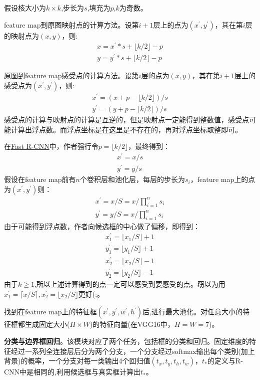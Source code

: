 \documentclass[]{article}
\begin{document}
假设核大小为$k \times k$,步长为$s$,填充为$p$,$k$为奇数。

feature map到原图映射点的计算方法。设第$i+1$层上的点为$(x^{'} ,y^{'})$，其在第$i$层的映射点为$(x,y)$，则:
\begin{align}
x=x^{'}*s+\lfloor k/2 \rfloor - p \\
y=y^{'}*s+\lfloor k/2 \rfloor - p 
\end{align}

原图到feature map感受点的计算方法。设第$i$层的点为$(x,y)$，其在第$i+1$层上的感受点为$(x^{'} ,y^{'})$，则:
\begin{align}
x^{'}=(x+p-\lfloor k/2 \rfloor)/s \\
y^{'}=(y+p-\lfloor k/2 \rfloor)/s
\end{align}
感受点的计算与映射点的计算是互逆的，但是映射点一定能得到整数值，感受点可能计算出浮点数。而浮点坐标是在这里是不存在的，再对浮点坐标取整即可。

在\href{./papers/Fast R-CNN.pdf}{Fast R-CNN}中，作者强行令$p=\lfloor k/2 \rfloor $，最终得到：
\begin{align}
	x^{'}=x/s \\
	y^{'}=y/s
\end{align}
假设在feature map前有$n$个卷积层和池化层，每层的步长为$s_i$，feature map上的点为$(x^{'} ,y^{'} )$则：
\begin{align}
	x^{'}=x/S=x/\prod_{i=1}^{n}s_i \\
	y^{'}=y/S=x/\prod_{i=1}^{n}s_i 
\end{align}
由于可能得到浮点数，作者向候选框的中心做了偏移，即得到：
\begin{align}
x_1^{'}=\lfloor x_1/S \rfloor +1\\
y_1^{'}=\lfloor y_1/S \rfloor +1\\
x_2^{'}=\lfloor x_2/S \rfloor -1\\
y_2^{'}=\lfloor y_2/S \rfloor -1
\end{align}
由于$k\geq 1$,所以上述计算得到的点一定可以感受到要感受的点。窃以为用$x_1^{'}=\lceil x/S \rceil,x_2^{'}=\lfloor x_2/S \rfloor$更好(:。

找到在feature map上的特征框$(x^{'},y^{'} ,w^{'} ,h^{'})$后,进行最大池化。对任意大小的特征框都生成固定大小($H \times W$)的特征向量(在VGG16中，$H=W=7$)。

\textbf{分类与边界框回归}。该模块对应了两个任务，包括框的分类和回归。固定维度的特征经过一系列全连接层后分为两个分支，一个分支经过softmax输出每个类别(加上背景)的概率，一个分支对每一类输出4个回归值$(t_x,t_y,t_h,t_w)$，$t_*$的定义与R-CNN中是相同的,利用候选框与真实框计算出$t_*$。
\end{document}
